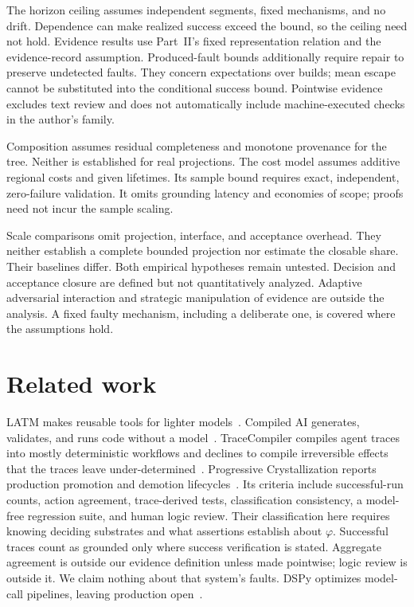 \documentclass[11pt]{article}
\theoremstyle{definition}
\theoremstyle{remark}
\begin{document}
The horizon ceiling assumes independent segments, fixed mechanisms, and no drift.
Dependence can make realized success exceed the bound, so the ceiling need not hold.
Evidence results use Part~II's fixed representation relation and the evidence-record assumption.
Produced-fault bounds additionally require repair to preserve undetected faults.
They concern expectations over builds; mean escape cannot be substituted into the conditional
success bound. Pointwise evidence excludes text review and does not automatically include
machine-executed checks in the author's family.

Composition assumes residual completeness and monotone provenance for the tree.
Neither is established for real projections.
The cost model assumes additive regional costs and given lifetimes.
Its sample bound requires exact, independent, zero-failure validation.
It omits grounding latency and economies of scope; proofs need not incur the sample scaling.

Scale comparisons omit projection, interface, and acceptance overhead.
They neither establish a complete bounded projection nor estimate the closable share.
Their baselines differ. Both empirical hypotheses remain untested.
Decision and acceptance closure are defined but not quantitatively analyzed.
Adaptive adversarial interaction and strategic manipulation of evidence are outside the analysis.
A fixed faulty mechanism, including a deliberate one, is covered where the assumptions hold.

\section{Related work}\label{sec:related}
LATM makes reusable tools for lighter models~\cite{cai2023latm}.
Compiled AI generates, validates, and runs code without a model~\cite{trooskens2026compiled}.
TraceCompiler compiles agent traces into mostly deterministic workflows and declines to compile
irreversible effects that the traces leave under-determined~\cite{elyadouni2026tracecompiler}.
Progressive Crystallization reports production promotion and demotion
lifecycles~\cite{malik2026crystallization}.
Its criteria include successful-run counts, action agreement, trace-derived tests, classification
consistency, a model-free regression suite, and human logic review.
Their classification here requires knowing deciding substrates and what assertions establish
about $\varphi$. Successful traces count as grounded only where success verification is stated.
Aggregate agreement is outside our evidence definition unless made pointwise; logic review is
outside it. We claim nothing about that system's faults.
DSPy optimizes model-call pipelines, leaving production open~\cite{khattab2023dspy}.
\end{document}
